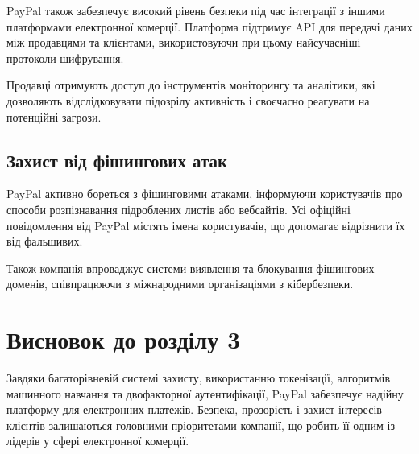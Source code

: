 PayPal також забезпечує високий рівень безпеки під час інтеграції з іншими платформами електронної комерції. Платформа підтримує API для передачі даних між продавцями та клієнтами, використовуючи при цьому найсучасніші протоколи шифрування. 

Продавці отримують доступ до інструментів моніторингу та аналітики, які дозволяють відслідковувати підозрілу активність і своєчасно реагувати на потенційні загрози.

\subsection{Захист від фішингових атак}

PayPal активно бореться з фішинговими атаками, інформуючи користувачів про способи розпізнавання підроблених листів або вебсайтів. Усі офіційні повідомлення від PayPal містять імена користувачів, що допомагає відрізнити їх від фальшивих.

Також компанія впроваджує системи виявлення та блокування фішингових доменів, співпрацюючи з міжнародними організаціями з кібербезпеки.

\section{Висновок до розділу 3}

Завдяки багаторівневій системі захисту, використанню токенізації, алгоритмів машинного навчання та двофакторної аутентифікації, PayPal забезпечує надійну платформу для електронних платежів. Безпека, прозорість і захист інтересів клієнтів залишаються головними пріоритетами компанії, що робить її одним із лідерів у сфері електронної комерції.
